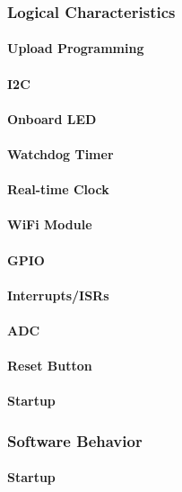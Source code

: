 \subsubsection{Logical Characteristics}
\paragraph{Upload Programming}
\paragraph{I2C}
\paragraph{Onboard LED}
\paragraph{Watchdog Timer}
\paragraph{Real-time Clock}
\paragraph{WiFi Module}
\paragraph{GPIO}
\paragraph{Interrupts/ISRs}
\paragraph{ADC}
\paragraph{Reset Button}
\paragraph{Startup}

\subsubsection{Software Behavior}
\paragraph{Startup}
